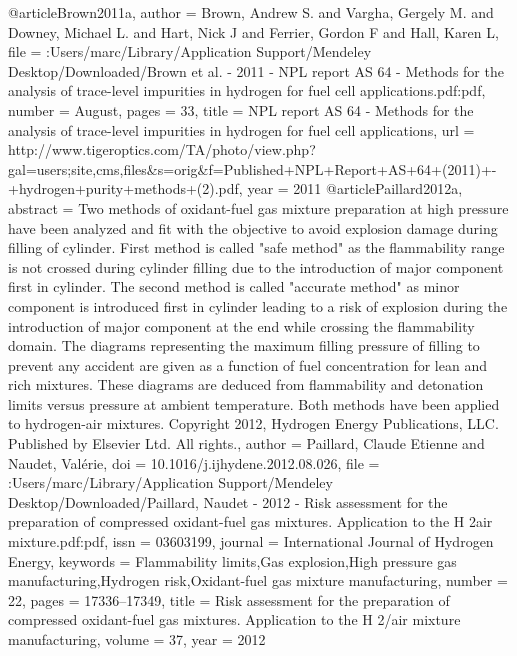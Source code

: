 @article{Brown2011a,
author = {Brown, Andrew S. and Vargha, Gergely M. and Downey, Michael L. and Hart, Nick J and Ferrier, Gordon F and Hall, Karen L},
file = {:Users/marc/Library/Application Support/Mendeley Desktop/Downloaded/Brown et al. - 2011 - NPL report AS 64 - Methods for the analysis of trace-level impurities in hydrogen for fuel cell applications.pdf:pdf},
number = {August},
pages = {33},
title = {{NPL report AS 64 - Methods for the analysis of trace-level impurities in hydrogen for fuel cell applications}},
url = {http://www.tigeroptics.com/TA/photo/view.php?gal=users;site,cms,files{\&}s=orig{\&}f=Published+NPL+Report+AS+64+(2011)+-+hydrogen+purity+methods+(2).pdf},
year = {2011}
}
@article{Paillard2012a,
abstract = {Two methods of oxidant-fuel gas mixture preparation at high pressure have been analyzed and fit with the objective to avoid explosion damage during filling of cylinder. First method is called "safe method" as the flammability range is not crossed during cylinder filling due to the introduction of major component first in cylinder. The second method is called "accurate method" as minor component is introduced first in cylinder leading to a risk of explosion during the introduction of major component at the end while crossing the flammability domain. The diagrams representing the maximum filling pressure of filling to prevent any accident are given as a function of fuel concentration for lean and rich mixtures. These diagrams are deduced from flammability and detonation limits versus pressure at ambient temperature. Both methods have been applied to hydrogen-air mixtures. Copyright {\textcopyright} 2012, Hydrogen Energy Publications, LLC. Published by Elsevier Ltd. All rights.},
author = {Paillard, Claude Etienne and Naudet, Val{\'{e}}rie},
doi = {10.1016/j.ijhydene.2012.08.026},
file = {:Users/marc/Library/Application Support/Mendeley Desktop/Downloaded/Paillard, Naudet - 2012 - Risk assessment for the preparation of compressed oxidant-fuel gas mixtures. Application to the H 2air mixture.pdf:pdf},
issn = {03603199},
journal = {International Journal of Hydrogen Energy},
keywords = {Flammability limits,Gas explosion,High pressure gas manufacturing,Hydrogen risk,Oxidant-fuel gas mixture manufacturing},
number = {22},
pages = {17336--17349},
title = {{Risk assessment for the preparation of compressed oxidant-fuel gas mixtures. Application to the H 2/air mixture manufacturing}},
volume = {37},
year = {2012}
}
